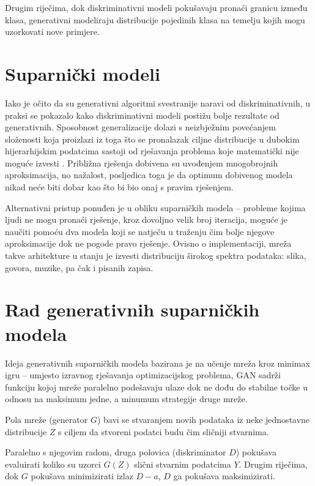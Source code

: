 \documentclass[lmodern, utf8, seminar]{fer}
\begin{document}
Drugim riječima, dok diskriminativni modeli pokušavaju pronaći granicu između klasa, generativni modeliraju distribucije pojedinih klasa na temelju kojih mogu uzorkovati nove primjere.
\newline

\newpage
\section{Suparnički modeli}
Iako je očito da su generativni algoritmi svestranije naravi od diskriminativnih, u praksi se pokazalo kako diskriminativni modeli postižu bolje rezultate od generativnih. Sposobnost generalizacije dolazi s neizbježnim povećanjem složenosti koja proizlazi iz toga što se pronalazak ciljne distribucije u dubokim hijerarhijskim podatcima sastoji od rješavanja problema koje matematički nije moguće izvesti \cite{goodfellow2014generative}. Približna rješenja dobivena su uvođenjem mnogobrojnih aproksimacija, no nažalost, posljedica toga je da optimum dobivenog modela nikad neće biti dobar kao što bi bio onaj s pravim rješenjem.
\newline

Alternativni pristup ponuđen je u obliku suparničkih modela -- probleme kojima ljudi ne mogu pronaći rješenje, kroz dovoljno velik broj iteracija, moguće je naučiti pomoću dva modela koji se natječu u traženju čim bolje njegove aproksimacije dok ne pogode pravo rješenje. Ovisno o implementaciji, mreža takve arhitekture u stanju je izvesti distribuciju širokog spektra podataka: slika, govora, muzike, pa čak i pisanih zapisa.
\newline



\section{Rad generativnih suparničkih modela}
Ideja generativnih suparničkih modela bazirana je na učenje mreža kroz minimax igru -- umjesto izravnog rješavanja optimizacijskog problema, GAN sadrži funkciju kojoj mreže paralelno podešavaju ulaze dok ne dođu do stabilne točke u odnosu na maksimum jedne, a minumum strategije druge mreže.
\newline

Pola mreže (generator $G$) bavi se stvaranjem novih podataka iz neke jednostavne distribucije $Z$ s ciljem da stvoreni podatci budu čim sličniji stvarnima. 

Paralelno s njegovim radom, druga polovica (diskriminator $D$) pokušava evaluirati koliko su uzorci $G(Z)$ slični stvarnim podatcima $Y$. Drugim riječima, dok $G$ pokušava minimizirati izlaz $D-a$, $D$ ga pokušava maksimizirati.
\newline
\newpage
\end{document}
